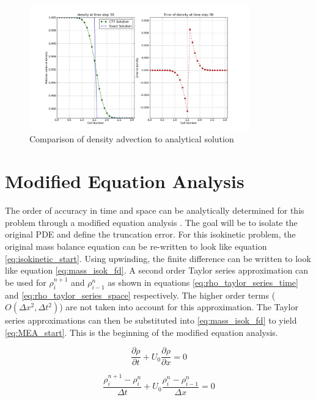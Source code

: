     \begin{figure}[!h]
    	\centering
   		\includegraphics[width=0.85\textwidth]{images/linear_CTF_CFL_0.500/tmp/plot_density_0030}
    	\caption{Comparison of density advection to analytical solution}
    	\label{fig:enthalpy_wave}
    \end{figure}
    
    \section{Modified Equation Analysis} \label{Verification:MEA}
    
    The order of accuracy in time and space can be analytically determined for
    this problem through a modified equation analysis \cite{Villatoro1999}. The
    goal will be to isolate the original PDE and define the truncation error.
    For this isokinetic problem, the original mass balance equation can be
    re-written to look like equation \ref{eq:isokinetic_start}. Using
    upwinding, the finite difference can be written to look like equation
    \ref{eq:mass_isok_fd}. A second order Taylor series approximation can be
    used for $\rho_{i}^{n+1}$ and $\rho_{i-1}^{n}$ as shown in equations
    \ref{eq:rho_taylor_series_time} and \ref{eq:rho_taylor_series_space}
    respectively. The higher order terms ($O(\Delta x^{2},\Delta t^{2} )$) are
    not taken into account for this approximation. The Taylor series
    approximations can then be substituted into \ref{eq:mass_isok_fd} to yield
    \ref{eq:MEA_start}. This is the beginning of the modified equation
    analysis. 
    
    \begin{equation}
    	\label{eq:isokinetic_start}
    	\frac{\partial \rho}{\partial t} + U_{0} \frac{\partial \rho}{\partial x} = 0
    \end{equation}
    
    \begin{equation}
    	\label{eq:mass_isok_fd}
    	\frac{ \rho_{i}^{n+1} - \rho_{i}^{n} }{\Delta t} 
    	+ U_{0} \frac{\rho_{i}^{n} - \rho_{i-1}^{n}}{\Delta x} = 0
    \end{equation}
    
